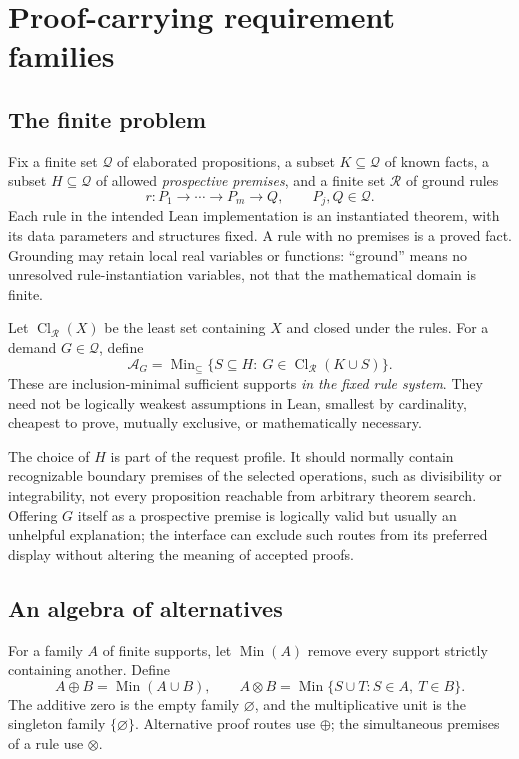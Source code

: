\documentclass[11pt,a4paper]{article}
\newcommand{\Cl}{\operatorname{Cl}}\newcommand{\Min}{\operatorname{Min}}
\theoremstyle{definition}\newtheorem{definition}[theorem]{Definition}
\theoremstyle{remark}\newtheorem{remark}[theorem]{Remark}
\begin{document}
\section{Proof-carrying requirement families}\label{sec:requirements}

\subsection{The finite problem}
Fix a finite set $\mathcal Q$ of elaborated propositions, a subset $K\subseteq\mathcal Q$ of known facts, a subset $H\subseteq\mathcal Q$ of allowed \emph{prospective premises}, and a finite set $\mathcal R$ of ground rules
\[
 r:P_1\to\cdots\to P_m\to Q,
 \qquad P_j,Q\in\mathcal Q.
\]
Each rule in the intended Lean implementation is an instantiated theorem, with its data parameters and structures fixed. A rule with no premises is a proved fact. Grounding may retain local real variables or functions: ``ground'' means no unresolved rule-instantiation variables, not that the mathematical domain is finite.

Let $\Cl_{\mathcal R}(X)$ be the least set containing $X$ and closed under the rules. For a demand $G\in\mathcal Q$, define
\begin{equation}\label{eq:minsupports}
 \mathcal A_G=\Min_{\subseteq}\{S\subseteq H:\ G\in\Cl_{\mathcal R}(K\cup S)\}.
\end{equation}
These are inclusion-minimal sufficient supports \emph{in the fixed rule system}. They need not be logically weakest assumptions in Lean, smallest by cardinality, cheapest to prove, mutually exclusive, or mathematically necessary.

The choice of $H$ is part of the request profile. It should normally contain recognizable boundary premises of the selected operations, such as divisibility or integrability, not every proposition reachable from arbitrary theorem search. Offering $G$ itself as a prospective premise is logically valid but usually an unhelpful explanation; the interface can exclude such routes from its preferred display without altering the meaning of accepted proofs.

\subsection{An algebra of alternatives}
For a family $A$ of finite supports, let $\Min(A)$ remove every support strictly containing another. Define
\[
 A\oplus B=\Min(A\cup B),\qquad
 A\otimes B=\Min\{S\cup T:S\in A,\ T\in B\}.
\]
The additive zero is the empty family $\varnothing$, and the multiplicative unit is the singleton family $\{\varnothing\}$. Alternative proof routes use $\oplus$; the simultaneous premises of a rule use $\otimes$.
\end{document}
